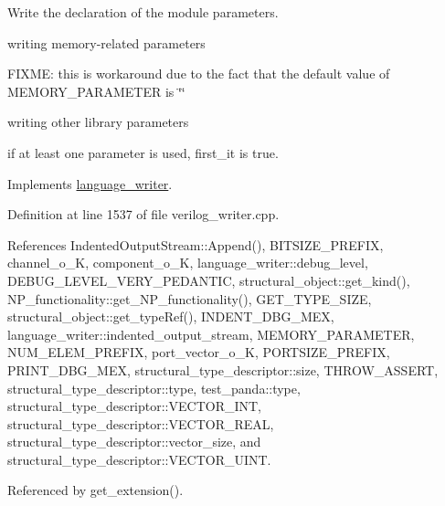 Write the declaration of the module parameters. 

writing memory-\/related parameters

F\+I\+X\+ME\+: this is workaround due to the fact that the default value of M\+E\+M\+O\+R\+Y\+\_\+\+P\+A\+R\+A\+M\+E\+T\+ER is \char`\"{}\char`\"{}

writing other library parameters

if at least one parameter is used, first\+\_\+it is true. 

Implements \hyperlink{classlanguage__writer_ad14ee8909894bca0a7d8874554d91d9b}{language\+\_\+writer}.



Definition at line 1537 of file verilog\+\_\+writer.\+cpp.



References Indented\+Output\+Stream\+::\+Append(), B\+I\+T\+S\+I\+Z\+E\+\_\+\+P\+R\+E\+F\+IX, channel\+\_\+o\+\_\+K, component\+\_\+o\+\_\+K, language\+\_\+writer\+::debug\+\_\+level, D\+E\+B\+U\+G\+\_\+\+L\+E\+V\+E\+L\+\_\+\+V\+E\+R\+Y\+\_\+\+P\+E\+D\+A\+N\+T\+IC, structural\+\_\+object\+::get\+\_\+kind(), N\+P\+\_\+functionality\+::get\+\_\+\+N\+P\+\_\+functionality(), G\+E\+T\+\_\+\+T\+Y\+P\+E\+\_\+\+S\+I\+ZE, structural\+\_\+object\+::get\+\_\+type\+Ref(), I\+N\+D\+E\+N\+T\+\_\+\+D\+B\+G\+\_\+\+M\+EX, language\+\_\+writer\+::indented\+\_\+output\+\_\+stream, M\+E\+M\+O\+R\+Y\+\_\+\+P\+A\+R\+A\+M\+E\+T\+ER, N\+U\+M\+\_\+\+E\+L\+E\+M\+\_\+\+P\+R\+E\+F\+IX, port\+\_\+vector\+\_\+o\+\_\+K, P\+O\+R\+T\+S\+I\+Z\+E\+\_\+\+P\+R\+E\+F\+IX, P\+R\+I\+N\+T\+\_\+\+D\+B\+G\+\_\+\+M\+EX, structural\+\_\+type\+\_\+descriptor\+::size, T\+H\+R\+O\+W\+\_\+\+A\+S\+S\+E\+RT, structural\+\_\+type\+\_\+descriptor\+::type, test\+\_\+panda\+::type, structural\+\_\+type\+\_\+descriptor\+::\+V\+E\+C\+T\+O\+R\+\_\+\+I\+NT, structural\+\_\+type\+\_\+descriptor\+::\+V\+E\+C\+T\+O\+R\+\_\+\+R\+E\+AL, structural\+\_\+type\+\_\+descriptor\+::vector\+\_\+size, and structural\+\_\+type\+\_\+descriptor\+::\+V\+E\+C\+T\+O\+R\+\_\+\+U\+I\+NT.



Referenced by get\+\_\+extension().

